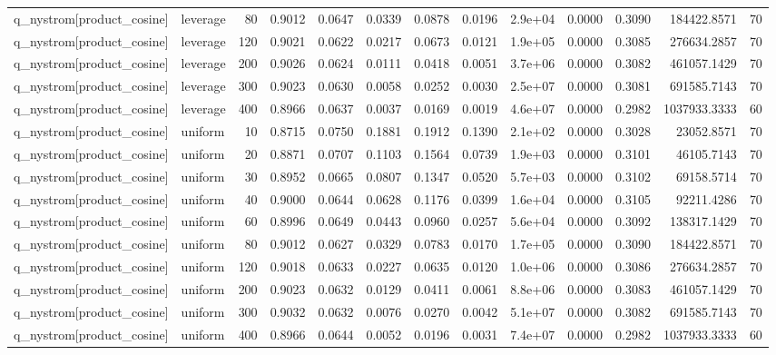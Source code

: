 \begin{table}
\begin{tabular}{llrrrrrrlrrrr}
q\_nystrom[product\_cosine] & leverage & 80 & 0.9012 & 0.0647 & 0.0339 & 0.0878 & 0.0196 & 2.9e+04 & 0.0000 & 0.3090 & 184422.8571 & 70 \\
q\_nystrom[product\_cosine] & leverage & 120 & 0.9021 & 0.0622 & 0.0217 & 0.0673 & 0.0121 & 1.9e+05 & 0.0000 & 0.3085 & 276634.2857 & 70 \\
q\_nystrom[product\_cosine] & leverage & 200 & 0.9026 & 0.0624 & 0.0111 & 0.0418 & 0.0051 & 3.7e+06 & 0.0000 & 0.3082 & 461057.1429 & 70 \\
q\_nystrom[product\_cosine] & leverage & 300 & 0.9023 & 0.0630 & 0.0058 & 0.0252 & 0.0030 & 2.5e+07 & 0.0000 & 0.3081 & 691585.7143 & 70 \\
q\_nystrom[product\_cosine] & leverage & 400 & 0.8966 & 0.0637 & 0.0037 & 0.0169 & 0.0019 & 4.6e+07 & 0.0000 & 0.2982 & 1037933.3333 & 60 \\
q\_nystrom[product\_cosine] & uniform & 10 & 0.8715 & 0.0750 & 0.1881 & 0.1912 & 0.1390 & 2.1e+02 & 0.0000 & 0.3028 & 23052.8571 & 70 \\
q\_nystrom[product\_cosine] & uniform & 20 & 0.8871 & 0.0707 & 0.1103 & 0.1564 & 0.0739 & 1.9e+03 & 0.0000 & 0.3101 & 46105.7143 & 70 \\
q\_nystrom[product\_cosine] & uniform & 30 & 0.8952 & 0.0665 & 0.0807 & 0.1347 & 0.0520 & 5.7e+03 & 0.0000 & 0.3102 & 69158.5714 & 70 \\
q\_nystrom[product\_cosine] & uniform & 40 & 0.9000 & 0.0644 & 0.0628 & 0.1176 & 0.0399 & 1.6e+04 & 0.0000 & 0.3105 & 92211.4286 & 70 \\
q\_nystrom[product\_cosine] & uniform & 60 & 0.8996 & 0.0649 & 0.0443 & 0.0960 & 0.0257 & 5.6e+04 & 0.0000 & 0.3092 & 138317.1429 & 70 \\
q\_nystrom[product\_cosine] & uniform & 80 & 0.9012 & 0.0627 & 0.0329 & 0.0783 & 0.0170 & 1.7e+05 & 0.0000 & 0.3090 & 184422.8571 & 70 \\
q\_nystrom[product\_cosine] & uniform & 120 & 0.9018 & 0.0633 & 0.0227 & 0.0635 & 0.0120 & 1.0e+06 & 0.0000 & 0.3086 & 276634.2857 & 70 \\
q\_nystrom[product\_cosine] & uniform & 200 & 0.9023 & 0.0632 & 0.0129 & 0.0411 & 0.0061 & 8.8e+06 & 0.0000 & 0.3083 & 461057.1429 & 70 \\
q\_nystrom[product\_cosine] & uniform & 300 & 0.9032 & 0.0632 & 0.0076 & 0.0270 & 0.0042 & 5.1e+07 & 0.0000 & 0.3082 & 691585.7143 & 70 \\
q\_nystrom[product\_cosine] & uniform & 400 & 0.8966 & 0.0644 & 0.0052 & 0.0196 & 0.0031 & 7.4e+07 & 0.0000 & 0.2982 & 1037933.3333 & 60 \\

\end{tabular}
\end{table}
